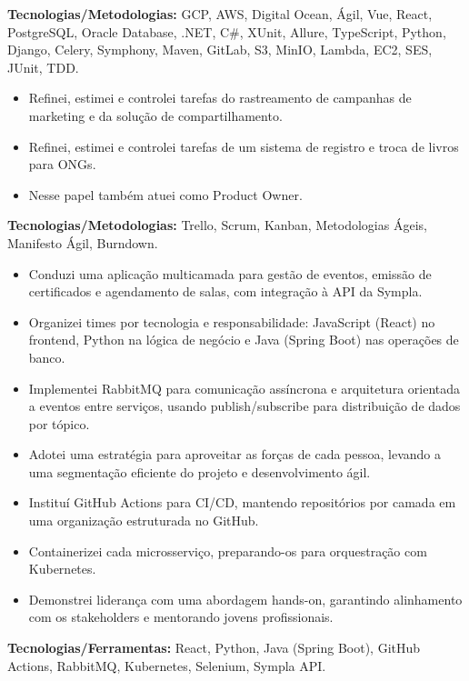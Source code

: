 \documentclass[10pt,a4paper]{altacv}
\begin{document}
\textbf{Tecnologias/Metodologias:} GCP, AWS, Digital Ocean, Ágil, Vue, React, PostgreSQL, Oracle Database, .NET, C\#, XUnit, Allure, TypeScript, Python, Django, Celery, Symphony, Maven, GitLab, S3, MinIO, Lambda, EC2, SES, JUnit, TDD.
\vspace{5mm}

\break
{}

\begin{itemize}
    \setlength{\itemindent}{0.5em}
    \item[--] Refinei, estimei e controlei tarefas do rastreamento de campanhas de marketing e da solução de compartilhamento.
    \item[--] Refinei, estimei e controlei tarefas de um sistema de registro e troca de livros para ONGs.
    \item[--] Nesse papel também atuei como Product Owner.
\end{itemize}
\textbf{Tecnologias/Metodologias:} Trello, Scrum, Kanban, Metodologias Ágeis, Manifesto Ágil, Burndown.
\vspace{5mm}

\begin{itemize}
    \setlength{\itemindent}{0.5em}
    \item[--] Conduzi uma aplicação multicamada para gestão de eventos, emissão de certificados e agendamento de salas, com integração à API da Sympla.
    \item[--] Organizei times por tecnologia e responsabilidade: JavaScript (React) no frontend, Python na lógica de negócio e Java (Spring Boot) nas operações de banco.
    \item[--] Implementei RabbitMQ para comunicação assíncrona e arquitetura orientada a eventos entre serviços, usando publish/subscribe para distribuição de dados por tópico.
    \item[--] Adotei uma estratégia para aproveitar as forças de cada pessoa, levando a uma segmentação eficiente do projeto e desenvolvimento ágil.
    \item[--] Instituí GitHub Actions para CI/CD, mantendo repositórios por camada em uma organização estruturada no GitHub.
    \item[--] Containerizei cada microsserviço, preparando-os para orquestração com Kubernetes.
    \item[--] Demonstrei liderança com uma abordagem hands-on, garantindo alinhamento com os stakeholders e mentorando jovens profissionais.
\end{itemize}
\textbf{Tecnologias/Ferramentas:} React, Python, Java (Spring Boot), GitHub Actions, RabbitMQ, Kubernetes, Selenium, Sympla API.
\end{document}
